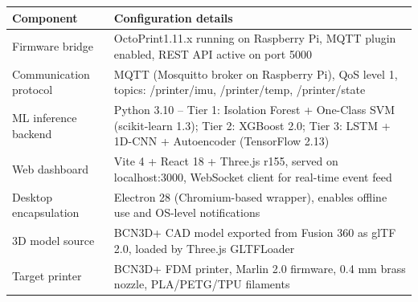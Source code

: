 \begin{tabular}{|L{4.5cm}|L{8.5cm}|}
	\hline
	\textbf{\color{white}Component} & \textbf{\color{white}Configuration details} \\
	\hline
	Firmware bridge & OctoPrint1.11.x running on Raspberry Pi, MQTT plugin enabled, REST API active on port 5000 \\
	\hline
	Communication protocol & MQTT (Mosquitto broker on Raspberry Pi), QoS level 1, topics: /printer/imu, /printer/temp, /printer/state \\
	\hline
	ML inference backend & Python 3.10 -- Tier 1: Isolation Forest + One-Class SVM (scikit-learn 1.3); Tier 2: XGBoost 2.0; Tier 3: LSTM + 1D-CNN + Autoencoder (TensorFlow 2.13) \\
	\hline
	Web dashboard & Vite 4 + React 18 + Three.js r155, served on localhost:3000, WebSocket client for real-time event feed \\
	\hline
	Desktop encapsulation & Electron 28 (Chromium-based wrapper), enables offline use and OS-level notifications \\
	\hline
	3D model source & BCN3D+ CAD model exported from Fusion 360 as glTF 2.0, loaded by Three.js GLTFLoader \\
	\hline
	Target printer & BCN3D+ FDM printer, Marlin 2.0 firmware, 0.4 mm brass nozzle, PLA/PETG/TPU filaments \\
	\hline
\end{tabular}